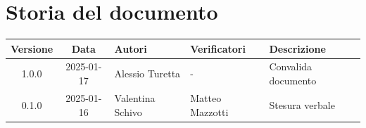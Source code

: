 \section*{Storia del documento}
\begin{tabularx}{\textwidth}{ c c p{2.75cm} p{2.75cm} X }
    \rowcolor{gray!20}\rule{0pt}{0.5cm}\textbf{Versione} & \textbf{Data} & \textbf{Autori} & \textbf{Verificatori} & \textbf{Descrizione} \\[0.7ex]
    \hline
    \rule{0pt}{0.5cm}1.0.0 & 2025-01-17 & Alessio Turetta & - & Convalida documento\\[0.7ex]
    \hline
    \rule{0pt}{0.5cm}0.1.0 & 2025-01-16 & Valentina Schivo & Matteo Mazzotti & Stesura verbale\\[0.7ex]
\end{tabularx}